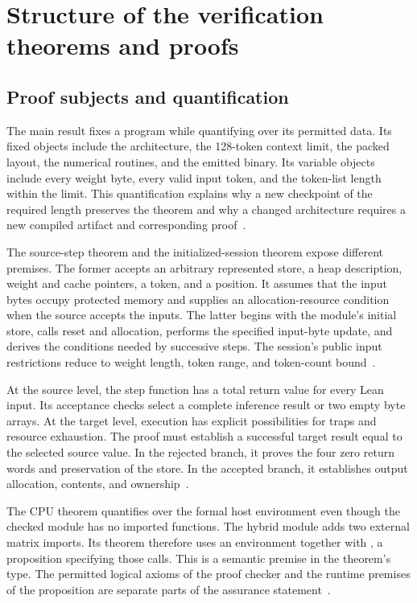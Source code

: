 \section{Structure of the verification theorems and proofs}
\label{sec:proof-structure}

\subsection{Proof subjects and quantification}

The main result fixes a program while quantifying over its permitted data.  Its fixed objects include the architecture, the 128-token context limit, the packed layout, the numerical routines, and the emitted binary.  Its variable objects include every weight byte, every valid input token, and the token-list length within the limit.  This quantification explains why a new checkpoint of the required length preserves the theorem and why a changed architecture requires a new compiled artifact and corresponding proof~\cite{artifact,session}.

The source-step theorem and the initialized-session theorem expose different premises.  The former accepts an arbitrary represented store, a heap description, weight and cache pointers, a token, and a position.  It assumes that the input bytes occupy protected memory and supplies an allocation-resource condition when the source accepts the inputs.  The latter begins with the module's initial store, calls reset and allocation, performs the specified input-byte update, and derives the conditions needed by successive steps.  The session's public input restrictions reduce to weight length, token range, and token-count bound~\cite{entry,initialize,session}.

At the source level, the step function has a total return value for every Lean input.  Its acceptance checks select a complete inference result or two empty byte arrays.  At the target level, execution has explicit possibilities for traps and resource exhaustion.  The proof must establish a successful target result equal to the selected source value.  In the rejected branch, it proves the four zero return words and preservation of the store.  In the accepted branch, it establishes output allocation, contents, and ownership~\cite{entry}.

The CPU theorem quantifies over the formal host environment even though the checked module has no imported functions.  The hybrid module adds two external matrix imports.  Its theorem therefore uses an environment together with , a proposition specifying those calls.  This is a semantic premise in the theorem's type.  The permitted logical axioms of the proof checker and the runtime premises of the proposition are separate parts of the assurance statement~\cite{artifact,wg-backend}.

